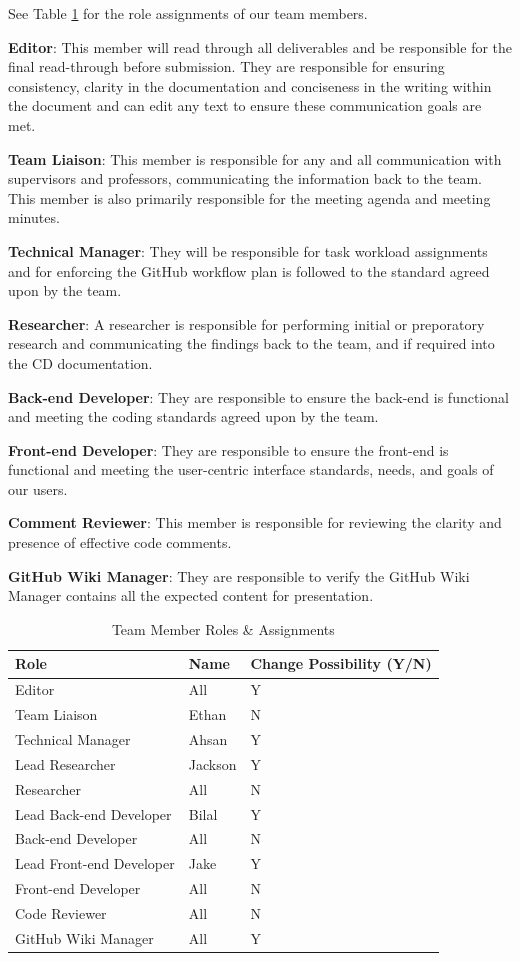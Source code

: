 \documentclass{article}
\begin{document}
See Table \ref{RoleAssignments} for the role assignments of our team members.

\textbf{Editor}: This member will read through all deliverables and be responsible for 
the final read-through before submission. They are responsible for ensuring 
consistency, clarity in the documentation and conciseness in the writing within the 
document and can edit any text to ensure these communication goals are met.

\textbf{Team Liaison}: This member is responsible for any and all communication with 
supervisors and professors, communicating the information back to the team. This 
member is also primarily responsible for the meeting agenda and meeting minutes.

\textbf{Technical Manager}: They will be responsible for task 
workload assignments and for enforcing the GitHub workflow plan is followed to the 
standard agreed upon by the team.

\textbf{Researcher}: A researcher is responsible for performing initial or preporatory 
research and communicating the findings back to the team, and if required into the CD 
documentation.

\textbf{Back-end Developer}: They are responsible to ensure the back-end is functional 
and meeting the coding standards agreed upon by the team.

\textbf{Front-end Developer}: They are responsible to ensure the front-end is functional 
and meeting the user-centric interface standards, needs, and goals of our users.

\textbf{Comment Reviewer}: This member is responsible for reviewing the clarity and 
presence of effective code comments.

\textbf{GitHub Wiki Manager}: They are responsible to verify the GitHub Wiki Manager 
contains all the expected content for presentation.

\begin{table}[H]
\caption{Team Member Roles \& Assignments} \label{RoleAssignments}
\begin{tabularx}{\textwidth}{llX}
\toprule
\textbf{Role} & \textbf{Name} & \textbf{Change Possibility (Y/N)} \\
\midrule
Editor & All & Y \\
Team Liaison & Ethan & N \\
Technical Manager & Ahsan & Y \\
Lead Researcher & Jackson & Y \\
Researcher & All & N \\
Lead Back-end Developer & Bilal & Y \\
Back-end Developer & All & N \\
Lead Front-end Developer & Jake & Y \\
Front-end Developer & All & N \\
Code Reviewer & All & N \\
GitHub Wiki Manager & All & Y \\

\bottomrule
\end{tabularx}
\end{table}
\end{document}
